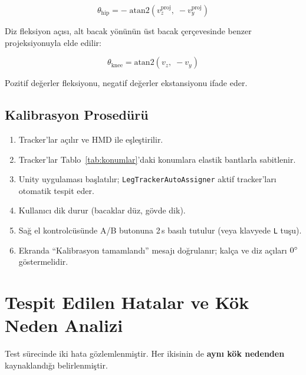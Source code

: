 \documentclass[11pt,a4paper]{article}
\begin{document}
\begin{equation}
    \theta_{\text{hip}} = -\;\text{atan2}\!\left(v_z^{\text{proj}},\; -v_y^{\text{proj}}\right)
    \label{eq:hip_angle}
\end{equation}

Diz fleksiyon a\c{c}{\i}s{\i}, alt bacak y\"on\"un\"un \"ust bacak \c{c}er\c{c}evesinde
benzer projeksiyonuyla elde edilir:

\begin{equation}
    \theta_{\text{knee}} = \text{atan2}\!\left(v_z,\; -v_y\right)
    \label{eq:knee_angle}
\end{equation}

Pozitif de\u{g}erler fleksiyonu, negatif de\u{g}erler ekstansiyonu ifade eder.

\subsection{Kalibrasyon Prosed\"ur\"u}

\begin{enumerate}[nosep]
    \item Tracker'lar a\c{c}{\i}l{\i}r ve HMD ile e\c{s}le\c{s}tirilir.
    \item Tracker'lar Tablo~\ref{tab:konumlar}'daki konumlara elastik
          bantlarla sabitlenir.
    \item Unity uygulamas{\i} ba\c{s}lat{\i}l{\i}r; \texttt{LegTrackerAutoAssigner}
          aktif tracker'lar{\i} otomatik tespit eder.
    \item Kullan{\i}c{\i} dik durur (bacaklar d\"uz, g\"ovde dik).
    \item Sa\u{g} el kontrolc\"us\"unde A/B butonuna 2\,s bas{\i}l{\i} tutulur
          (veya klavyede \texttt{L} tu\c{s}u).
    \item Ekranda ``Kalibrasyon tamamland{\i}'' mesaj{\i} do\u{g}rulan{\i}r;
          kal\c{c}a ve diz a\c{c}{\i}lar{\i} $0\degree$ g\"ostermelidir.
\end{enumerate}

\section{Tespit Edilen Hatalar ve K\"ok Neden Analizi}
\label{sec:hatalar}

Test s\"urecinde iki hata g\"ozlemlenmi\c{s}tir. Her ikisinin de \textbf{ayn{\i}
k\"ok nedenden} kaynakland{\i}\u{g}{\i} belirlenmi\c{s}tir.
\end{document}
